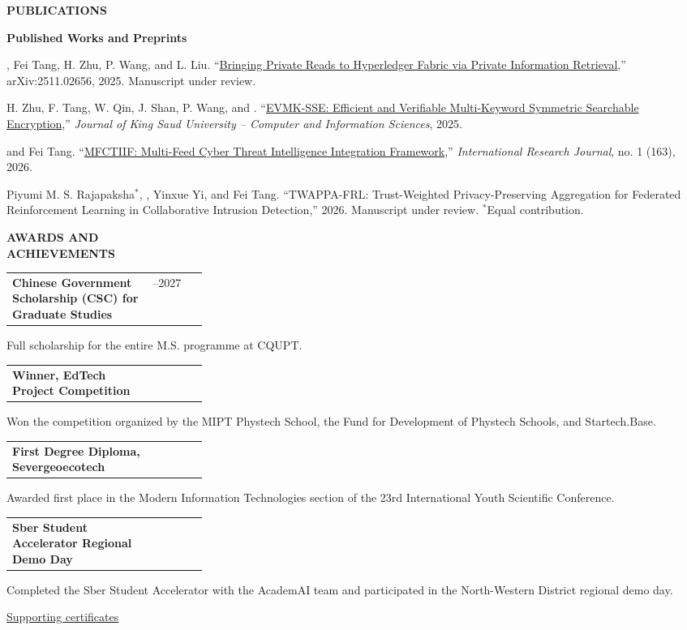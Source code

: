 \documentclass[11pt,a4paper]{article}
\makeatletter
\newcommand{\cvrow}[2]{%
  \noindent
  \begin{minipage}[t]{0.145\textwidth}
    \vspace{0pt}%
    \raggedright
    \fontsize{8.5}{10}\selectfont
    \bfseries\MakeUppercase{#1}
  \end{minipage}%
  \hfill
  \begin{minipage}[t]{0.835\textwidth}
    \vspace{0pt}%
    #2
  \end{minipage}\par
}
\newcommand{\entry}[2]{%
  \begin{tabularx}{\linewidth}{@{}X >{\raggedleft\arraybackslash}p{0.28\linewidth}@{}}
    #1 & #2
  \end{tabularx}
}
\newcommand{\pub}[2]{%
  #1 #2\par
  \vspace{0.28em}
}
\makeatother
\begin{document}
\vspace{0.75em}

\cvrow{Publications}{%
  \textbf{Published Works and Preprints}\par\vspace{0.25em}

  \pub{\underbar{Artur Iasenovets}, Fei Tang, H. Zhu, P. Wang, and L. Liu.}
  {``\href{https://arxiv.org/abs/2511.02656}
  {Bringing Private Reads to Hyperledger Fabric via Private Information Retrieval},''
  arXiv:2511.02656, 2025. Manuscript under review.}

  \pub{H. Zhu, F. Tang, W. Qin, J. Shan, P. Wang, and \underbar{Artur Iasenovets}.}
  {``\href{https://doi.org/10.1007/s44443-025-00405-8}
  {EVMK-SSE: Efficient and Verifiable Multi-Keyword Symmetric Searchable Encryption},''
  \textit{Journal of King Saud University -- Computer and Information Sciences}, 2025.}

  \pub{\underbar{Artur Iasenovets} and Fei Tang.}
  {``\href{https://doi.org/10.60797/IRJ.2026.163.57}
  {MFCTIIF: Multi-Feed Cyber Threat Intelligence Integration Framework},''
  \textit{International Research Journal}, no. 1 (163), 2026.}

  \pub{Piyumi M. S. Rajapaksha$^{*}$, \underbar{Artur Iasenovets$^{*}$},
  Yinxue Yi, and Fei Tang.}
  {``TWAPPA-FRL: Trust-Weighted Privacy-Preserving Aggregation for Federated
  Reinforcement Learning in Collaborative Intrusion Detection,''
  2026. Manuscript under review. $^{*}$Equal contribution.}
}

\vspace{0.75em}

\cvrow{Awards and\\Achievements}{%
  \entry
    {\textbf{Chinese Government Scholarship (CSC) for Graduate Studies}}
    {2024--2027}
  Full scholarship for the entire M.S. programme at CQUPT.

  \vspace{0.45em}
  \entry
    {\textbf{Winner, EdTech Project Competition}}
    {2023}
  Won the competition organized by the MIPT Phystech School,
  the Fund for Development of Phystech Schools, and Startech.Base.

  \vspace{0.45em}
  \entry
    {\textbf{First Degree Diploma, Severgeoecotech}}
    {2022}
  Awarded first place in the Modern Information Technologies section of the
  23rd International Youth Scientific Conference.

  \vspace{0.45em}
  \entry
    {\textbf{Sber Student Accelerator Regional Demo Day}}
    {2023}
  Completed the Sber Student Accelerator with the AcademAI team and
  participated in the North-Western District regional demo day.

  \vspace{0.3em}
  \href{https://iasenovets.github.io/files/certificates_selected_en_public_ready_v2.pdf}
       {\small Supporting certificates}
}
\end{document}
